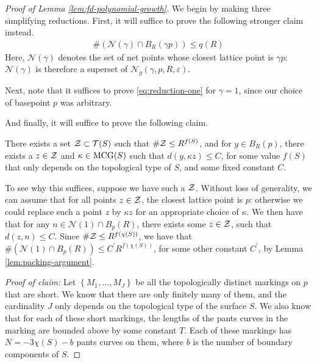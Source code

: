 \documentclass[12pt, reqno]{amsart}
\begin{document}
\begin{proof}[Proof of Lemma \ref{lem:fd-polynomial-growth}]
  We begin by making three simplifying reductions.
  First, it will suffice to prove the following stronger claim instead.
  \begin{align}
    \label{eq:reduction-one}
    \#\left( \mathcal{N}(\gamma) \cap B_R(\gamma p) \right) \leq q(R)
  \end{align}
  Here, $\mathcal{N}(\gamma)$ denotes the set of net points whose closest lattice point is $\gamma p$: $\mathcal{N}(\gamma)$ is therefore a superset of $\mathcal{N}_g(\gamma, p, R, \varepsilon)$.

  Next, note that it suffices to prove \eqref{eq:reduction-one} for $\gamma = 1$, since our choice of basepoint $p$ was arbitrary.

  And finally, it will suffice to prove the following claim.
  \begin{claim*}
  There exists a set $\mathcal{Z} \subset \mathcal{T}(S)$ such that $\# \mathcal{Z} \leq R^{f(S)}$, and for $y \in B_R(p)$, there exists a $z \in \mathcal{Z}$ and $\kappa \in \mathrm{MCG}(S)$ such that $d(y, \kappa z) \leq C$, for some value $f(S)$ that only depends on the topological type of $S$, and some fixed constant $C$.
  \end{claim*}
  To see why this suffices, suppose we have such a $\mathcal{Z}$.
  Without loss of generality, we can assume that for all points $z \in \mathcal{Z}$, the closest lattice point is $p$: otherwise we could replace such a point $z$ by $\kappa z$ for an appropriate choice of $\kappa$.
We then have that for any $n \in \mathcal{N}(1) \cap B_p(R)$, there exists some $z \in \mathcal{Z}$, such that $d(z, n) \leq C$.
Since $\# \mathcal{Z} \leq R^{f(\chi(S))}$, we have that $\#\left( \mathcal{N}(1) \cap B_p(R) \right) \leq C^{\prime} R^{f(\chi(S))}$, for some other constant $C^{\prime}$, by Lemma \ref{lem:packing-argument}.

\emph{Proof of claim:}
  Let $\left\{ M_1, \ldots, M_J \right\}$ be all the topologically distinct markings on $p$ that are short.
  We know that there are only finitely many of them, and the cardinality $J$ only depends on the topological type of the surface $S$.
  We also know that for each of these short markings, the lengths of the pants curves in the marking are bounded above by some constant $T$.
  Each of these markings has $N = -3 \chi(S) - b$ pants curves on them, where $b$ is the number of boundary components of $S$.


\end{proof}
\end{document}
